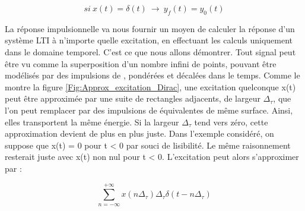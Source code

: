 	\begin{equation}\label{}
          si~x(t)=\delta (t)~\rightarrow ~y_{f}(t) = y_{0}(t)	 	
	\end{equation}
	
	
	
	\vspace{1\baselineskip} La réponse impulsionnelle va nous
        fournir un moyen de calculer la réponse d'un système LTI à
        n'importe quelle excitation, en effectuant les calculs
        uniquement dans le domaine temporel. C'est ce que nous allons
        démontrer. Tout signal peut être vu comme la superposition
        d'un nombre infini de points, pouvant être modélisés par des
        impulsions de \Dirac, pondérées et décalées dans le
        temps. Comme le montre la figure
        \ref{Fig:Approx_excitation_Dirac}, une excitation quelconque
        x(t) peut être approximée par une suite de rectangles
        adjacents, de largeur $ \Delta_\tau $, que l'on peut remplacer
        par des impulsions de \Dirac{} équivalentes de même
        surface. Ainsi, elles transportent la même énergie. Si la
        largeur $ \Delta_\tau $ tend vers zéro, cette approximation
        devient de plus en plus juste. Dans l'exemple considéré, on
        suppose que x(t) = 0 pour t \textless{} 0 par souci de
        lisibilité. Le même raisonnement resterait juste avec x(t) non
        nul pour t \textless{} 0. L'excitation peut alors s'approximer
        par :
	
	
	\begin{equation*}\label{}
          \sum_{n=-\infty}^{+\infty}x(n\Delta_\tau) 	\Delta_\tau  \delta (t-n\Delta_\tau)	
	\end{equation*}
	
